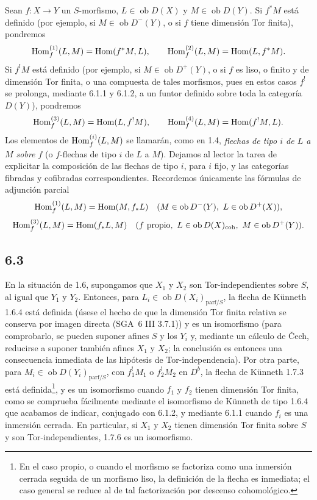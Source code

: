 Sean $f:X\to Y$ un $S$-morfismo, $L\in\operatorname{ob}D(X)$ y $M\in\operatorname{ob}D(Y)$. Si $f^*M$ está definido (por ejemplo, si $M\in\operatorname{ob}D^-(Y)$, o si $f$ tiene dimensión Tor finita), pondremos
\[
\operatorname{Hom}_f^{(1)}(L,M)=\operatorname{Hom}(f^*M,L),\qquad
\operatorname{Hom}_f^{(2)}(L,M)=\operatorname{Hom}(L,f^*M).
\]
Si $f^!M$ está definido (por ejemplo, si $M\in\operatorname{ob}D^+(Y)$, o si $f$ es liso, o finito y de dimensión Tor finita, o una compuesta de tales morfismos, pues en estos casos $f^!$ se prolonga, mediante 6.1.1 y 6.1.2, a un funtor definido sobre toda la categoría $D(Y)$), pondremos
\[
\operatorname{Hom}_f^{(3)}(L,M)=\operatorname{Hom}(L,f^!M),\qquad
\operatorname{Hom}_f^{(4)}(L,M)=\operatorname{Hom}(f^!M,L).
\]
Los elementos de $\operatorname{Hom}_f^{(i)}(L,M)$ se llamarán, como en 1.4, \emph{flechas de tipo $i$ de $L$ a $M$ sobre $f$} (o $f$-flechas de tipo $i$ de $L$ a $M$). Dejamos al lector la tarea de explicitar la composición de las flechas de tipo $i$, para $i$ fijo, y las categorías fibradas y cofibradas correspondientes. Recordemos únicamente las fórmulas de adjunción parcial
\[
\Hom_f^{(1)}(L,M)=\Hom(M,f_*L)\quad(M\in\operatorname{ob}D^{-}(Y),\ L\in\operatorname{ob}D^+(X)),
\]
\[
\Hom_f^{(3)}(L,M)=\Hom(f_*L,M)\quad(f\text{ propio},\ L\in\operatorname{ob}D(X)_{\mathrm{coh}},\ M\in\operatorname{ob}D^+(Y)).
\]

\subsection*{6.3}
En la situación de 1.6, supongamos que $X_1$ y $X_2$ son Tor-independientes sobre $S$, al igual que $Y_1$ y $Y_2$. Entonces, para $L_i\in\operatorname{ob}D(X_i)_{\mathrm{parf}/S}$, la flecha de Künneth 1.6.4 está definida (úsese el hecho de que la dimensión Tor finita relativa se conserva por imagen directa (SGA~6 III 3.7.1)) y es un isomorfismo (para comprobarlo, se pueden suponer afines $S$ y los $Y_i$ y, mediante un cálculo de Čech, reducirse a suponer también afines $X_1$ y $X_2$; la conclusión es entonces una consecuencia inmediata de las hipótesis de Tor-independencia). Por otra parte, para $M_i\in\operatorname{ob}D(Y_i)_{\mathrm{parf}/S}$, con $f_1^!M_1$ o $f_2^!M_2$ en $D^b$, la flecha de Künneth 1.7.3 está definida\footnote{En el caso propio, o cuando el morfismo se factoriza como una inmersión cerrada seguida de un morfismo liso, la definición de la flecha es inmediata; el caso general se reduce al de tal factorización por descenso cohomológico.}, y es un isomorfismo cuando $f_1$ y $f_2$ tienen dimensión Tor finita, como se comprueba fácilmente mediante el isomorfismo de Künneth de tipo 1.6.4 que acabamos de indicar, conjugado con 6.1.2, y mediante 6.1.1 cuando $f_i$ es una inmersión cerrada. En particular, si $X_1$ y $X_2$ tienen dimensión Tor finita sobre $S$ y son Tor-independientes, 1.7.6 es un isomorfismo.

